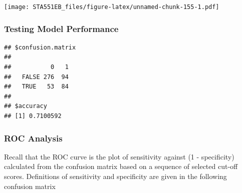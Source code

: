\documentclass[
]{book}
\newenvironment{Shaded}{\begin{snugshade}}{\end{snugshade}}
\newcommand{\AttributeTok}[1]{\textcolor[rgb]{0.13,0.29,0.53}{#1}}
\newcommand{\CommentTok}[1]{\textcolor[rgb]{0.56,0.35,0.01}{\textit{#1}}}
\newcommand{\DecValTok}[1]{\textcolor[rgb]{0.00,0.00,0.81}{#1}}
\newcommand{\FunctionTok}[1]{\textcolor[rgb]{0.13,0.29,0.53}{\textbf{#1}}}
\newcommand{\NormalTok}[1]{#1}
\newcommand{\OtherTok}[1]{\textcolor[rgb]{0.56,0.35,0.01}{#1}}
\newcommand{\SpecialCharTok}[1]{\textcolor[rgb]{0.81,0.36,0.00}{\textbf{#1}}}
\begin{document}
\texttt{[image: STA551EB\_files/figure-latex/unnamed-chunk-155-1.pdf]}

\hfill\break

\hypertarget{testing-model-performance}{%
\subsubsection{Testing Model Performance}\label{testing-model-performance}}

\begin{Shaded}
\end{Shaded}

\begin{verbatim}
## $confusion.matrix
##        
##           0   1
##   FALSE 276  94
##   TRUE   53  84
## 
## $accuracy
## [1] 0.7100592
\end{verbatim}

\hypertarget{roc-analysis}{%
\subsubsection{ROC Analysis}\label{roc-analysis}}

Recall that the ROC curve is the plot of sensitivity against (1 - specificity) calculated from the confusion matrix based on a sequence of selected cut-off scores. Definitions of sensitivity and specificity are given in the following confusion matrix
\end{document}
